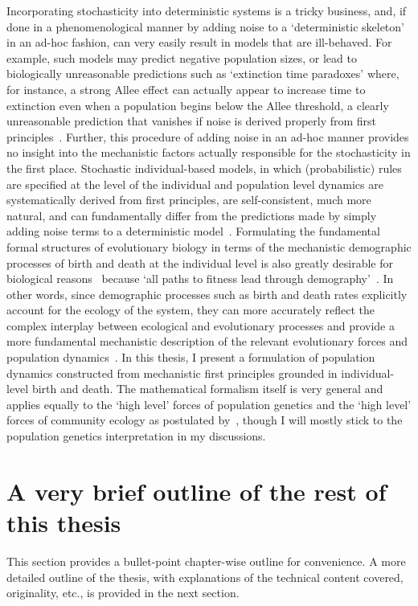 Incorporating stochasticity into deterministic systems is a tricky business, and, if done in a phenomenological manner by adding noise to a `deterministic skeleton'~\citep{coulson_skeletons_2004} in an ad-hoc fashion, can very easily result in models that are ill-behaved. For example, such models may predict negative population sizes, or lead to biologically unreasonable predictions such as `extinction time paradoxes' where, for instance, a strong Allee effect can actually appear to increase time to extinction even when a population begins below the Allee threshold, a clearly unreasonable prediction that vanishes if noise is derived properly from first principles~\citep{black_stochastic_2012,strang_how_2019}. Further, this procedure of adding noise in an ad-hoc manner provides no insight into the mechanistic factors actually responsible for the stochasticity in the first place. Stochastic individual-based models, in which (probabilistic) rules are specified at the level of the individual and population level dynamics are systematically derived from first principles, are self-consistent, much more natural, and can fundamentally differ from the predictions made by simply adding noise terms to a deterministic model~\citep{black_stochastic_2012,strang_how_2019}. Formulating the fundamental formal structures of evolutionary biology in terms of the mechanistic demographic processes of birth and death at the individual level is also greatly desirable for biological reasons~\citep{metcalf_why_2007,geritz_mathematical_2012} because `all paths to fitness lead through demography'~\citep{metcalf_all_2007}. In other words, since demographic processes such as birth and death rates explicitly account for the ecology of the system, they can more accurately reflect the complex interplay between ecological and evolutionary processes and provide a more fundamental mechanistic description of the relevant evolutionary forces and population dynamics~\citep{doebeli_towards_2017}. In this thesis, I present a formulation of population dynamics constructed from mechanistic first principles grounded in individual-level birth and death. The mathematical formalism itself is very general and applies equally to the `high level' forces of population genetics and the `high level' forces of community ecology as postulated by~\citet{vellend_theory_2016}, though I will mostly stick to the population genetics interpretation in my discussions.

\section{A very brief outline of the rest of this thesis}
This section provides a bullet-point chapter-wise outline for convenience. A more detailed outline of the thesis, with explanations of the technical content covered, originality, etc., is provided in the next section.


